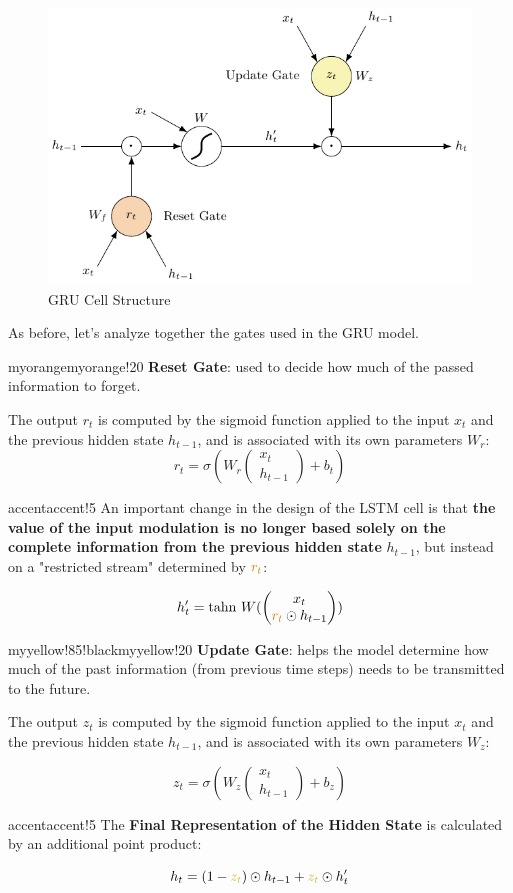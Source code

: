 \begin{figure}[!htbp]
    \centering
    \includegraphics[width=0.85\linewidth]{tikz/chapter6 - GRU.pdf}
    \caption{GRU Cell Structure}
\end{figure}

As before, let's analyze together the gates used in the GRU model.

\begin{remark}{myorange}{myorange!20}
\textbf{Reset Gate}: used to decide how much of the passed information to forget.

The output $r_t$ is computed by the sigmoid function applied to the input $x_t$ and the previous hidden state $h_{t-1}$, and is associated with its own parameters $W_r$:
$$ r_t = \sigma(W_r
\begin{pmatrix}
x_t \\
h_{t-1}
\end{pmatrix} + b_t)
$$
\end{remark}

\begin{remark}{accent}{accent!5}
An important change in the design of the LSTM cell is that \textbf{the value of the input modulation is no longer based solely on the complete information from the previous hidden state} $h_{t-1}$, but instead on a "restricted stream" determined by $\textcolor{myorange}{r_t}$:

$$ h'_t = \text{tahn }W(
\begin{pmatrix}
x_t \\
\textcolor{myorange}{r_t} \odot h_{t-1}
\end{pmatrix})
$$
\end{remark}

\begin{remark}{myyellow!85!black}{myyellow!20}
\textbf{Update Gate}: helps the model determine how much of the past information (from previous time steps) needs to be transmitted to the future.

The output $z_t$ is computed by the sigmoid function applied to the input $x_t$ and the previous hidden state $h_{t-1}$, and is associated with its own parameters $W_z$:

$$ z_t = \sigma(W_z
\begin{pmatrix}
x_t \\
h_{t-1}
\end{pmatrix} + b_z)
$$
\end{remark}


\begin{remark}{accent}{accent!5}
The \textbf{Final Representation of the Hidden State} is calculated by an additional point product:

$$h_t = (1-\textcolor{myyellow!85!black}{z_t})\odot h_{t-1}+\textcolor{myyellow!85!black}{z_t} \odot h'_t$$
\end{remark}

